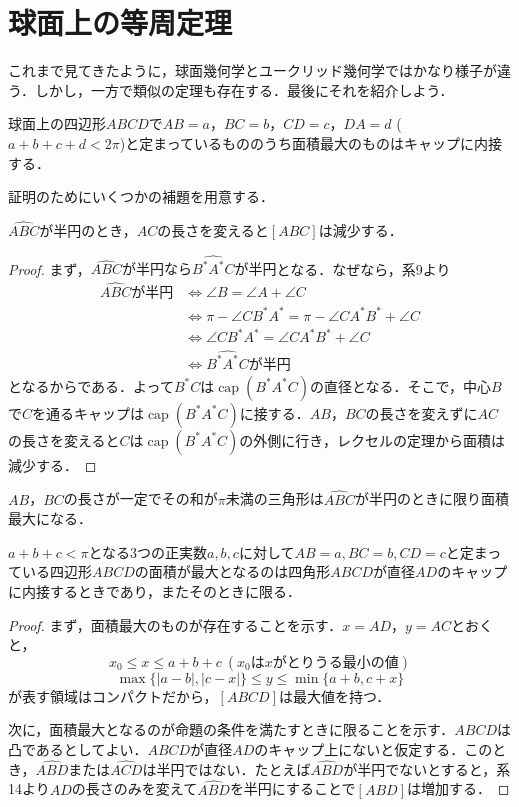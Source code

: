 \documentclass[uplatex]{jsarticle}
\DeclareMathOperator{\capp}{cap}
\begin{document}
\section{球面上の等周定理}
これまで見てきたように，球面幾何学とユークリッド幾何学ではかなり様子が違う．しかし，一方で類似の定理も存在する．最後にそれを紹介しよう．
\begin{theorem}[球面上の四角形の等周定理]\label{toushuu}
  球面上の四辺形$ABCD$で$AB=a$，$BC=b$，$CD=c$，$DA=d$ ($a+b+c+d<2\pi$)と定まっているもののうち面積最大のものはキャップに内接する．\end{theorem}
証明のためにいくつかの補題を用意する．

\begin{lemma}$\widehat{ABC}$が半円のとき，$AC$の長さを変えると$[ABC]$は減少する．\end{lemma}
\begin{proof}
まず，$\widehat{ABC}が半円なら\widehat{B^*A^*C}が半円$となる．なぜなら，系9より
\begin{align*}
\widehat{ABC} が半円 &\Leftrightarrow \angle B=\angle A+\angle C \\
&\Leftrightarrow \pi-\angle CB^*A^*=\pi-\angle CA^*B^*+\angle C \\
&\Leftrightarrow \angle CB^*A^*=\angle CA^*B^*+\angle C \\
&\Leftrightarrow \widehat{B^*A^*C} が半円
\end{align*}
となるからである．よって$B^*C$は$\capp(B^*A^*C)$の直径となる．そこで，中心$B$で$C$を通るキャップは$\capp(B^*A^*C)$に接する．$AB，BC$の長さを変えずに$AC$の長さを変えると$C$は$\capp(B^*A^*C)$の外側に行き，レクセルの定理から面積は減少する．
\end{proof}

\begin{corollary}$AB$，$BC$の長さが一定でその和が$\pi$未満の三角形は$\widehat{ABC}$が半円のときに限り面積最大になる．\end{corollary}

\begin{lemma}$a+b+c<\pi$となる3つの正実数$a,b,c$に対して$AB=a,BC=b,CD=c$と定まっている四辺形$ABCD$の面積が最大となるのは四角形$ABCD$が直径$AD$のキャップに内接するときであり，またそのときに限る．\end{lemma}
\begin{proof}
まず，面積最大のものが存在することを示す．$x=AD，y=AC$とおくと，
\[ x_0\le x\le a+b+c   \    (x_0はxがとりうる最小の値) \]
\[ \max\{|a-b|,|c-x|\}\le y\le \min\{a+b,c+x\} \]
が表す領域はコンパクトだから，$[ABCD]$は最大値を持つ．

次に，面積最大となるのが命題の条件を満たすときに限ることを示す．$ABCD$は凸であるとしてよい．$ABCD$が直径$AD$のキャップ上にないと仮定する．このとき，$\widehat{ABD}$または$\widehat{ACD}$は半円ではない．たとえば$\widehat{ABD}$が半円でないとすると，系14より$AD$の長さのみを変えて$\widehat{ABD}$を半円にすることで$[ABD]$は増加する．
\end{proof}
\end{document}
